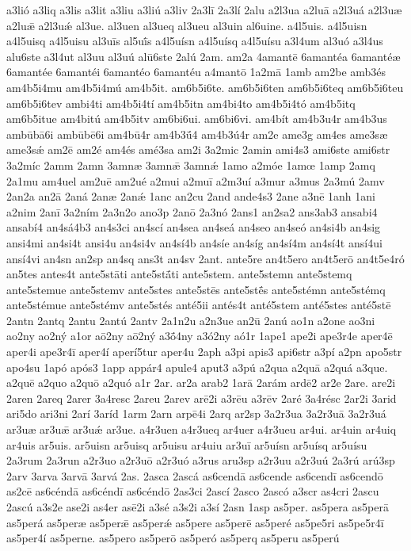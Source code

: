 {a3lió
a3liq
a3lis
a3lit
a3liu
a3liú
a3liv
2a3lī
2a3lí
2alu
a2l3ua
a2luā
a2l3uá
a2l3uæ
a2luǣ
a2l3uǽ
al3ue.
al3uen
al3ueq
al3ueu
al3uin
al6uine.
a4l5uis.
a4l5uisn
a4l5uisq
a4l5uisu
al3uīs
al5uī́s
a4l5uísn
a4l5uísq
a4l5uísu
a3l4um
al3uó
a3l4us
alu6ste
a3l4ut
al3uu
al3uú
alū6ste
2alú
2am.
am2a
4amantē
6amantéa
6amantéæ
6amantée
6amantéi
6amantéo
6amantéu
a4mantō
1a2mā
1amb
am2be
amb3és
am4b5i4mu
am4b5i4mú
am4b5it.
am6b5i6te.
am6b5i6ten
am6b5i6teq
am6b5i6teu
am6b5i6tev
ambi4ti
am4b5i4tí
am4b5itn
am4bi4to
am4b5i4tó
am4b5itq
am6b5itue
am4bitú
am4b5itv
am6bi6ui.
am6bi6vi.
am4bít
am4b3u4r
am4b3us
ambūbā6i
ambūbē6i
am4bū4r
am4b3ū́4
am4b3ú4r
am2e
ame3g
am4es
ame3sæ
ame3sǽ
am2ē
am2é
am4és
amé3sa
am2i
3a2mic
2amin
ami4s3
ami6ste
ami6str
3a2míc
2amm
2amn
3amnæ
3amnǣ
3amnǽ
1amo
a2móe
1amœ
1amp
2amq
2a1mu
am4uel
am2uē
am2ué
a2mui
a2muī
a2m3uí
a3mur
a3mus
2a3mú
2amv
2an2a
an2ā
2aná
2anæ
2anǽ
1anc
an2cu
2and
ande4s3
2ane
a3nē
1anh
1ani
a2nim
2anī
3a2ním
2a3n2o
ano3p
2anō
2a3nó
2ans1
an2sa2
ans3ab3
ansabi4
ansabí4
an4sá4b3
an4s3ci
an4scí
an4sea
an4seá
an4seo
an4seó
an4si4b
an4sig
ansi4mi
an4si4t
ansi4u
an4si4v
an4sí4b
an4síe
an4síg
an4sí4m
an4sí4t
ansí4ui
ansí4vi
an4sn
an2sp
an4sq
ans3t
an4sv
2ant.
ante5re
an4t5ero
an4t5erō
an4t5e4ró
an5tes
antes4t
ante5stāti
ante5stā́ti
ante5stem.
ante5stemn
ante5stemq
ante5stemue
ante5stemv
ante5stes
ante5stēs
ante5stḗs
ante5stémn
ante5stémq
ante5stémue
ante5stémv
ante5stés
anté5ii
antés4t
anté5stem
anté5stes
anté5stē
2antn
2antq
2antu
2antú
2antv
2a1n2u
a2n3ue
an2ū
2anú
ao1n
a2one
ao3ni
ao2ny
ao2ný
a1or
aō2ny
aō2ný
a3ṓ4ny
a3ó2ny
aó1r
1ape1
ape2i
ape3r4e
aper4ē
aper4i
ape3r4ī
aper4í
aperí5tur
aper4u
2aph
a3pi
apis3
api6str
a3pí
a2pn
apo5str
apo4su
1apó
após3
1app
appár4
apule4
aput3
a3pú
a2qua
a2quā
a2quá
a3que.
a2quē
a2quo
a2quō
a2quó
a1r
2ar.
ar2a
arab2
1arā
2arám
ardē2
ar2e
2are.
are2i
2aren
2areq
2arer
3a4resc
2areu
2arev
arē2i
a3rēu
a3rēv
2aré
3a4résc
2ar2i
3arid
ari5do
ari3ni
2arí
3aríd
1arm
2arn
arpē4i
2arq
ar2sp
3a2r3ua
3a2r3uā
3a2r3uá
ar3uæ
ar3uǣ
ar3uǽ
ar3ue.
a4r3uen
a4r3ueq
ar4uer
a4r3ueu
ar4ui.
ar4uin
ar4uiq
ar4uis
ar5uis.
ar5uisn
ar5uisq
ar5uisu
ar4uiu
ar3uī
ar5uísn
ar5uísq
ar5uísu
2a3rum
2a3run
a2r3uo
a2r3uō
a2r3uó
a3rus
aru3sp
a2r3uu
a2r3uú
2a3rú
arú3sp
2arv
3arva
3arvā
3arvá
2as.
2asca
2ascá
as6cendā
as6cende
as6cendī
as6cendō
as2cē
as6céndā
as6céndī
as6céndō
2as3ci
2ascí
2asco
2ascó
a3scr
as4cri
2ascu
2ascú
a3s2e
ase2i
as4er
asē2i
a3sé
a3s2i
a3sí
2asn
1asp
as5per.
as5pera
as5perā
as5perá
as5peræ
as5perǣ
as5perǽ
as5pere
as5perē
as5peré
as5pe5ri
as5pe5r4ī
as5per4í
as5perne.
as5pero
as5perō
as5peró
as5perq
as5peru
as5perú
}
